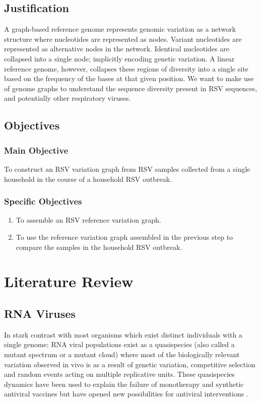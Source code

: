 \documentclass[10pt, a4paper]{article}
\begin{document}
\subsection{Justification}
\label{sec:org29580d0}
A graph-based reference genome represents genomic variation as a network
structure where nucleotides are represented as nodes.
Variant nucleotides are represented as alternative nodes in the network.
Identical nucleotides are collapsed into a single node; implicitly encoding
genetic variation.
A linear reference genome, however, collapses these regions of diversity into a
single site based on the frequency of the bases at that given position.
We want to make use of genome graphs to understand the sequence diversity
present in RSV sequences, and potentially other respiratory viruses.

\newpage
\subsection{Objectives}
\label{sec:org632f81a}
\subsubsection{Main Objective}
\label{sec:orge598cbb}
To construct an RSV variation graph from RSV samples collected from a single
household in the course of a household RSV outbreak.

\subsubsection{Specific Objectives}
\label{sec:org856c953}
\begin{enumerate}
\item To assemble an RSV reference variation graph.
\item To use the reference variation graph assembled in the previous step to
compare the samples in the household RSV outbreak.
\end{enumerate}
\newpage
\section{Literature Review}
\label{sec:org69e18c0}
\subsection{RNA Viruses}
\label{sec:orgb8b3fc1}
In stark contrast with most organisms which exist distinct individuals with a
single genome; RNA viral populations exist as a quasispecies (also called a
mutant spectrum or a mutant cloud) where most of the biologically relevant
variation observed in vivo is as a result of genetic variation, competitive
selection and random events acting on multiple replicative units.
These quasispecies dynamics have been used to explain the failure of monotherapy
and synthetic antiviral vaccines but have opened new possibilities for antiviral
interventions \cite{domingoViralQuasispeciesEvolution2012}.
\end{document}
